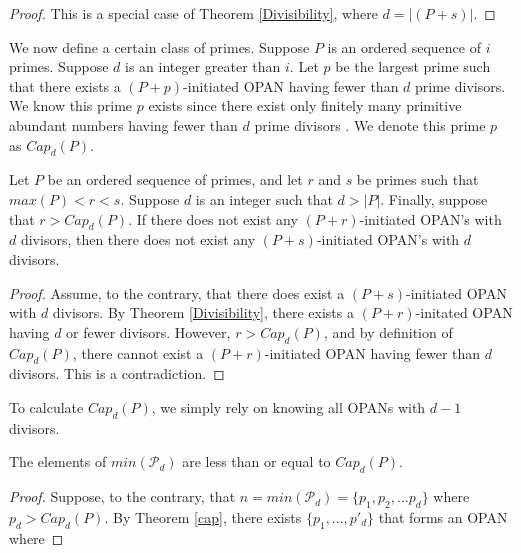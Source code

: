 \documentclass[../paper.tex]{subfiles}
\begin{document}
\begin{proof}
This is a special case of Theorem {\ref{Divisibility}}, where $d = |(P + s)|$.
\end{proof}

We now define a certain class of primes.
Suppose $P$ is an ordered sequence of $i$ primes. Suppose $d$ is
an integer greater than $i$. Let $p$ be the largest prime such 
that there exists a $(P + p)$-initiated OPAN having fewer than $d$ 
prime divisors. We know this prime $p$ exists since 
there exist only finitely many primitive abundant numbers having
fewer than $d$ prime divisors \cite{dickson}. We denote this prime $p$
as $Cap_d(P)$. 

\begin{theorem}\label{cap}
Let $P$ be an ordered sequence of primes, and  let $r$ and $s$ be 
primes such that $max(P) < r < s$. Suppose $d$ is an integer such
that $d > |P|$. Finally, suppose that $r > Cap_d(P)$. If there
does not exist any $(P + r)$-initiated OPAN's with $d$ divisors,
then there does not exist any $(P + s)$-initiated OPAN's with $d$ 
divisors.
\end{theorem}

\begin{proof}
Assume, to the contrary, that there does exist a $(P + 
s)$-initiated OPAN with $d$ divisors. By Theorem {\ref{Divisibility}},
there exists a $(P + r)$-initated OPAN having $d$ or fewer
divisors. However, $r > Cap_d(P)$, and by definition of
$Cap_d(P)$, there cannot exist a $(P + r)$-initiated OPAN having
fewer than $d$ divisors. This is a contradiction.
\end{proof}

To calculate $Cap_d(P)$, we simply rely on knowing all OPANs with $d - 1$ divisors.

\begin{theorem} The elements of $min(\mathcal{P}_d)$ are less than or equal to $Cap_d(P)$.

\begin{proof}
Suppose, to the contrary, that $n = min(\mathcal{P}_d) = \{p_{1},
p_{2}, ... p_{d}\}$ where $p_d > Cap_d(P)$. By Theorem \ref{cap},
  there exists $\{p_{1}, ..., p'_{d}\}$ that forms an OPAN where 


\end{proof}
\end{theorem}
\end{document}

